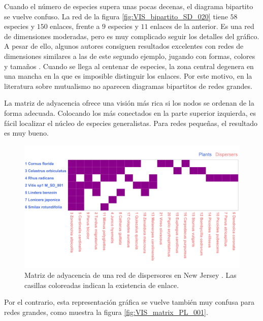 Cuando el número de especies supera unas pocas decenas, el diagrama bipartito se vuelve confuso. La red de la figura \ref{fig:VIS_bipartito_SD_020} tiene $58$ especies y $150$ enlaces, frente a $9$ especies y $11$ enlaces de la anterior. Es una red de dimensiones moderadas, pero es muy complicado seguir los detalles del gráfico. A pesar de ello, algunos autores consiguen resultados excelentes con redes de dimensiones similares a las de este segundo ejemplo, jugando con formas, colores y tamaños \cite{dakos2014critical}. Cuando se llega al centenar de especies, la zona central degenera en una mancha en la que es imposible distinguir los enlaces. Por este motivo, en la literatura sobre mutualismo no aparecen diagramas bipartitos de redes grandes. 

La matriz de adyacencia ofrece una visión más rica si los nodos se ordenan de la forma adecuada. Colocando los más conectados en la parte superior izquierda, es fácil localizar el núcleo de especies generalistas. Para redes pequeñas, el resultado es muy bueno.

\begin{figure}[h!]
\centering
\includegraphics[scale=0.14]{Figures/VIS_matrix_SD_001.png}
\caption{Matriz de adyacencia de una red de dispersores en New Jersey \cite{baird1980selection}. Las casillas coloreadas indican la existencia de enlace.}
\label{fig:VIS_matrix_SD_001}
\end{figure}

Por el contrario, esta representación gráfica se vuelve también muy confusa para redes grandes, como muestra la figura \ref{fig:VIS_matrix_PL_001}.

